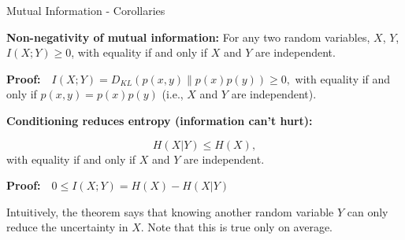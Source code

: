 \documentclass[11pt,compress,t,notes=noshow, xcolor=table]{beamer}
\begin{document}
    

\begin{vbframe}{Mutual Information - Corollaries}

\small

\textbf{Non-negativity of mutual information:} For any two random variables, $X$, $Y$, $ I(X;Y) \geq 0$, with equality if and only if $X$ and $Y$ are independent. 

\lz

\textbf{Proof:}$\quad I(X ; Y)=D_{KL}(p(x, y) \| p(x) p(y)) \geq 0,$ with equality if and only if $p(x, y)=p(x) p(y)$ (i.e., $X$ and $Y$ are independent).

\lz
  
\textbf{Conditioning reduces entropy (information can't hurt):}

$$H(X | Y) \leq H(X),$$
with equality if and only if $X$ and $Y$ are independent.

\lz

\textbf{Proof:}$\quad 0 \leq I(X ; Y)=H(X)-H(X | Y)$

Intuitively, the theorem says that knowing another random variable $Y$ can only reduce the uncertainty in $X$. Note that this is true only on average. 
\vspace{0.5cm}


\framebreak





\end{vbframe}
\end{document}
